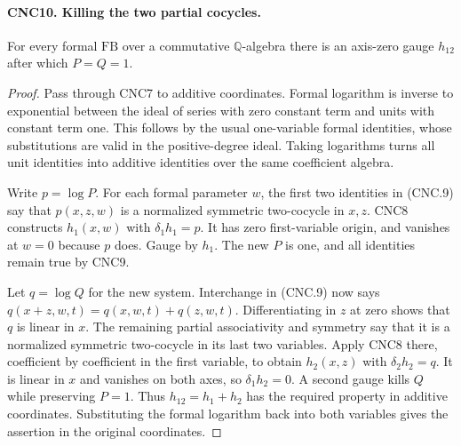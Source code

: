 \paragraph{CNC10. Killing the two partial cocycles.}
\label{claim:CNC10}
For every formal \(\mathrm{FB}\) over a commutative
\(\mathbb Q\)-algebra there is an axis-zero gauge \(h_{12}\)
after which \(P=Q=1\).
\begin{proof}
Pass through CNC7 to additive coordinates.  Formal logarithm is inverse
to exponential between the ideal of series with zero constant term and
units with constant term one.  This follows by the usual one-variable
formal identities, whose substitutions are valid in the positive-degree
ideal.  Taking logarithms turns all unit identities into additive
identities over the same coefficient algebra.

Write \(p=\log P\).  For each formal parameter \(w\), the
first two identities in (CNC.9) say that \(p(x,z,w)\) is a
normalized symmetric two-cocycle in \(x,z\).  CNC8 constructs
\(h_1(x,w)\) with \(\delta_1h_1=p\).  It has zero first-variable
origin, and vanishes at \(w=0\) because \(p\) does.  Gauge by
\(h_1\).  The new \(P\) is one, and all identities remain true
by CNC9.

Let \(q=\log Q\) for the new system.  Interchange in (CNC.9)
now says
\(q(x+z,w,t)=q(x,w,t)+q(z,w,t)\).
Differentiating in \(z\) at zero shows that \(q\) is linear
in \(x\).  The remaining partial associativity and symmetry say
that it is a normalized symmetric two-cocycle in its last two variables.
Apply CNC8 there, coefficient by coefficient in the first variable,
to obtain \(h_2(x,z)\) with \(\delta_2h_2=q\).
It is linear in \(x\) and vanishes on both axes, so
\(\delta_1h_2=0\).  A second gauge kills \(Q\) while preserving
\(P=1\).  Thus \(h_{12}=h_1+h_2\) has the required property
in additive coordinates.  Substituting the formal logarithm back into
both variables gives the assertion in the original coordinates.
\end{proof}

